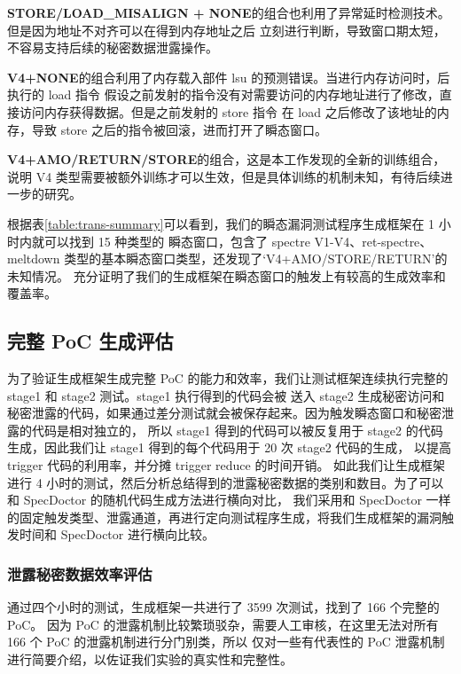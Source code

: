 \textbf{STORE/LOAD\_MISALIGN + NONE}的组合也利用了异常延时检测技术。但是因为地址不对齐可以在得到内存地址之后
立刻进行判断，导致窗口期太短，不容易支持后续的秘密数据泄露操作。\par

\textbf{V4+NONE}的组合利用了内存载入部件 lsu 的预测错误。当进行内存访问时，后执行的 load 指令
假设之前发射的指令没有对需要访问的内存地址进行了修改，直接访问内存获得数据。但是之前发射的 store 指令
在 load 之后修改了该地址的内存，导致 store 之后的指令被回滚，进而打开了瞬态窗口。\par

\textbf{V4+AMO/RETURN/STORE}的组合，这是本工作发现的全新的训练组合，
说明 V4 类型需要被额外训练才可以生效，但是具体训练的机制未知，有待后续进一步的研究。\par

根据表\ref{table:trans-summary}可以看到，我们的瞬态漏洞测试程序生成框架在 1 小时内就可以找到 15 种类型的
瞬态窗口，包含了 spectre V1-V4、ret-spectre、meltdown 类型的基本瞬态窗口类型，还发现了‘V4+AMO/STORE/RETURN’的未知情况。
充分证明了我们的生成框架在瞬态窗口的触发上有较高的生成效率和覆盖率。\par

\subsection{完整 PoC 生成评估}

为了验证生成框架生成完整 PoC 的能力和效率，我们让测试框架连续执行完整的 stage1 和 stage2 测试。stage1 执行得到的代码会被
送入 stage2 生成秘密访问和秘密泄露的代码，如果通过差分测试就会被保存起来。因为触发瞬态窗口和秘密泄露的代码是相对独立的，
所以 stage1 得到的代码可以被反复用于 stage2 的代码生成，因此我们让 stage1 得到的每个代码用于 20 次 stage2 代码的生成，
以提高 trigger 代码的利用率，并分摊 trigger reduce 的时间开销。
如此我们让生成框架进行 4 小时的测试，然后分析总结得到的泄露秘密数据的类别和数目。为了可以和 SpecDoctor 的随机代码生成方法进行横向对比，
我们采用和 SpecDoctor 一样的固定触发类型、泄露通道，再进行定向测试程序生成，将我们生成框架的漏洞触发时间和 SpecDoctor 进行横向比较。\par

\subsubsection{泄露秘密数据效率评估}

通过四个小时的测试，生成框架一共进行了 3599 次测试，找到了 166 个完整的 PoC。
因为 PoC 的泄露机制比较繁琐驳杂，需要人工审核，在这里无法对所有 166 个 PoC 的泄露机制进行分门别类，所以
仅对一些有代表性的 PoC 泄露机制进行简要介绍，以佐证我们实验的真实性和完整性。\par

